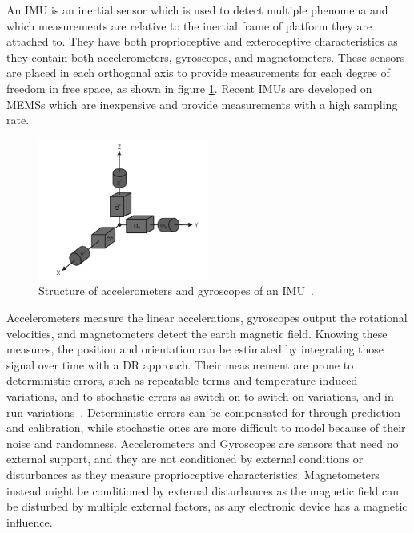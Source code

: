 \noindent An \gls{IMU} is an inertial sensor which is used to detect multiple phenomena and which measurements are relative to the inertial frame of platform they are attached to.
They have both proprioceptive and exteroceptive characteristics as they contain both accelerometers, gyroscopes, and magnetometers.
These sensors are placed in each orthogonal axis to provide measurements for each degree of freedom in free space, as shown in figure \ref{fig:imu}.
Recent \glspl{IMU} are developed on \glspl{MEMS} which are inexpensive and provide measurements with a high sampling rate.
\begin{figure}[!ht]
  \begin{center}
    \includegraphics[width=0.5\textwidth]{Images/2-Background/IMU-2021-04-23 14-13-19.png}
  \end{center}
  \caption{Structure of accelerometers and gyroscopes of an \Gls{IMU}~\cite{inertial}.}
  \label{fig:imu}
\end{figure}

Accelerometers measure the linear accelerations, gyroscopes output the rotational velocities, and magnetometers detect the earth magnetic field.
Knowing these measures, the position and orientation can be estimated by integrating those signal over time with a \gls{DR} approach.
Their measurement are prone to deterministic errors, such as repeatable terms and temperature induced variations, and to stochastic errors as switch-on to switch-on variations, and in-run variations~\cite{magnusson_improving_2012}.
Deterministic errors can be compensated for through prediction and calibration, while stochastic ones are more difficult to model because of their noise and randomness.
Accelerometers and Gyroscopes are sensors that need no external support, and they are not conditioned by external conditions or disturbances as they measure proprioceptive characteristics.
Magnetometers instead might be conditioned by external disturbances as the magnetic field can be disturbed by multiple external factors, as any electronic device has a magnetic influence.

